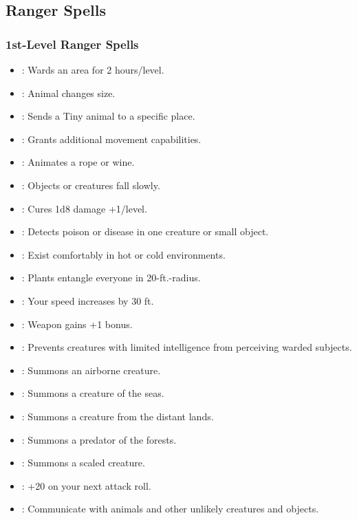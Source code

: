 \subsection{Ranger Spells}
\subsubsection{1st-Level Ranger Spells}
\begin{itemize}
\item {}: Wards an area for 2 hours/level.
\item {}: Animal changes size.
\item {}: Sends a Tiny animal to a specific place.
\item {}: Grants additional movement capabilities.
\item {}: Animates a rope or wine.
\item {}: Objects or creatures fall slowly.
\item {}: Cures 1d8 damage +1/level.
\item {}: Detects poison or disease in one creature or small object.
\item {}: Exist comfortably in hot or cold environments.
\item {}: Plants entangle everyone in 20-ft.-radius.
\item {}: Your speed increases by 30 ft.
\item {}: Weapon gains +1 bonus.
\item {}: Prevents creatures with limited intelligence from perceiving warded subjects.
\item {}: Summons an airborne creature.
\item {}: Summons a creature of the seas.
\item {}: Summons a creature from the distant lands.
\item {}: Summons a predator of the forests.
\item {}: Summons a scaled creature.
\item {}: +20 on your next attack roll.
\item {}: Communicate with animals and other unlikely creatures and objects.
\end{itemize}
